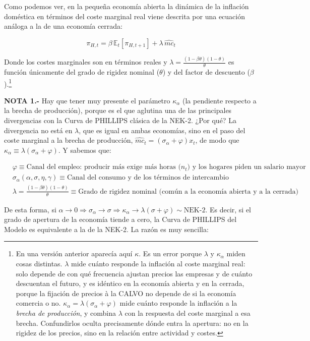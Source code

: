 \documentclass[10pt,a4paper]{article}
\begin{document}
Como podemos ver, en la pequeña economía abierta la dinámica de la inflación doméstica en términos del coste marginal real viene descrita por una ecuación análoga a la de una economía cerrada: 

$$\pi_{H,t} = \beta\,\mathbb E_t[\pi_{H,t+1}] + \lambda\, \widehat{mc}_t$$

Donde los costes marginales son en términos reales y $\lambda=\frac{(1-\beta\theta)(1-\theta)}{\theta}$ es función únicamente del grado de rigidez nominal ($\theta$) y del factor de descuento ($\beta$).\footnote{%
En una versión anterior aparecía aquí $\kappa$. Es un error porque $\lambda$ y $\kappa_\alpha$ miden cosas distintas. $\lambda$ mide cuánto responde la inflación al coste marginal real: solo depende de con qué frecuencia ajustan precios las empresas y de cuánto descuentan el futuro, y es idéntico en la economía abierta y en la cerrada, porque la fijación de precios à la CALVO no depende de si la economía comercia o no. $\kappa_\alpha=\lambda(\sigma_\alpha+\varphi)$ mide cuánto responde la inflación a la \textit{brecha de producción}, y combina $\lambda$ con la respuesta del coste marginal a esa brecha. Confundirlos oculta precisamente dónde entra la apertura: no en la rigidez de los precios, sino en la relación entre actividad y costes.
%
}

\textbf{NOTA 1.-} Hay que tener muy presente el parámetro $\kappa_\alpha$ (la pendiente respecto a la brecha de producción), porque es el que aglutina una de las principales divergencias con la Curva de PHILLIPS clásica de la NEK-2. ¿Por qué? La divergencia no está en $\lambda$, que es igual en ambas economías, sino en el paso del coste marginal a la brecha de producción, $\widehat{mc}_t=(\sigma_\alpha+\varphi)x_t$, de modo que $\kappa_\alpha\equiv\lambda(\sigma_\alpha+\varphi)$. Y sabemos que:

$$\begin{aligned}
        &\varphi\equiv\text{Canal del empleo: producir más exige más horas ($n_t$) y los hogares piden un salario mayor}\\[0.5em]
        &\sigma_\alpha(\alpha,\sigma,\eta,\gamma)\equiv\text{Canal del consumo y de los términos de intercambio}\\[0.5em]
        &\lambda=\frac{(1-\beta\theta)(1-\theta)}{\theta}\equiv\text{Grado de rigidez nominal (común a la economía abierta y a la cerrada)}
\end{aligned}$$

De esta forma, si $\alpha\to0\Longrightarrow\sigma_\alpha\to\sigma\Longrightarrow\kappa_\alpha\to\lambda(\sigma+\varphi)\sim\text{NEK-2}$. Es decir, si el grado de apertura de la economía tiende a cero, la Curva de PHILLIPS del Modelo es equivalente a la de la NEK-2. La razón es muy sencilla:
\end{document}
